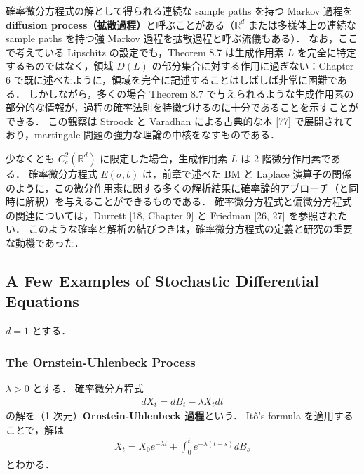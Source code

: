 \documentclass{jsarticle}
\begin{document}
確率微分方程式の解として得られる連続な sample paths を持つ Markov 過程を \textbf{diffusion process（拡散過程）}と呼ぶことがある（$\mathbb{R}^d$ または多様体上の連続な sample paths を持つ強 Markov 過程を拡散過程と呼ぶ流儀もある）．
なお，ここで考えている Lipschitz の設定でも，Theorem 8.7 は生成作用素 $L$ を完全に特定するものではなく，領域 $D(L)$ の部分集合に対する作用に過ぎない：Chapter 6 で既に述べたように，領域を完全に記述することはしばしば非常に困難である．
しかしながら，多くの場合 Theorem 8.7 で与えられるような生成作用素の部分的な情報が，過程の確率法則を特徴づけるのに十分であることを示すことができる．
この観察は Stroock と Varadhan による古典的な本 [77] で展開されており，martingale 問題の強力な理論の中核をなすものである．

少なくとも $C_{c}^2(\mathbb{R}^d)$ に限定した場合，生成作用素 $L$ は 2 階微分作用素である．
確率微分方程式 $E(\sigma, b)$ は，前章で述べた BM と Laplace 演算子の関係のように，この微分作用素に関する多くの解析結果に確率論的アプローチ（と同時に解釈）を与えることができるものである．
確率微分方程式と偏微分方程式の関連については，Durrett [18, Chapter 9] と Friedman [26, 27] を参照されたい．
このような確率と解析の結びつきは，確率微分方程式の定義と研究の重要な動機であった．


\subsection{A Few Examples of Stochastic Differential Equations}

$d=1$ とする．

\subsubsection{The Ornstein-Uhlenbeck Process}

$\lambda>0$ とする．
確率微分方程式
\begin{align}
    dX_{t}
    = dB_{t} - \lambda X_{t}dt
\end{align}
の解を（1 次元）\textbf{Ornstein-Uhlenbeck 過程}という．
It\^{o}'s formula を適用することで，解は
\begin{align}
    X_{t}
    = X_{0}e^{-\lambda t}
    + \int_{0}^{t}e^{-\lambda(t-s)}dB_{s}
\end{align}
とわかる．
\end{document}
